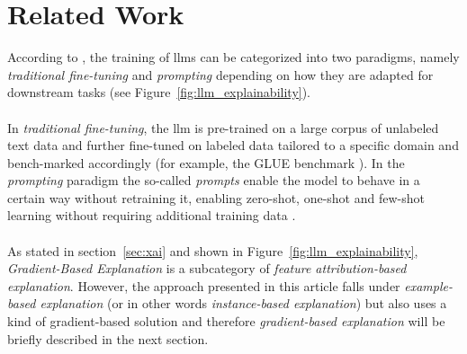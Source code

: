\chapter{Related Work}
According to \cite{zhao2023explainabilitylargelanguagemodels}, the training of \acrshort{llm}s can be categorized into two paradigms, namely \textit{traditional fine-tuning} and \textit{prompting} depending on how they are adapted for downstream tasks (see Figure~\ref{fig:llm_explainability}). 
\\\\
In \textit{traditional fine-tuning}, the \acrlong{llm} is pre-trained on a large corpus of unlabeled text data and further fine-tuned on labeled data tailored to a specific domain and bench-marked accordingly (for example, the GLUE benchmark \cite{wang2019gluemultitaskbenchmarkanalysis}). In the \textit{prompting} paradigm the so-called \textit{prompts} enable the model to behave in a certain way without retraining it, enabling zero-shot, one-shot and few-shot learning without requiring additional training data \cite{brown2020languagemodelsfewshotlearners}. 
\\\\
As stated in section~\ref{sec:xai} and shown in Figure~\ref{fig:llm_explainability}, \textit{Gradient-Based Explanation} is a subcategory of \textit{feature attribution-based explanation}. However, the approach presented in this article falls under \textit{example-based explanation} (or in other words \textit{instance-based explanation}) but also uses a kind of gradient-based solution and therefore \textit{gradient-based explanation} will be briefly described in the next section.

